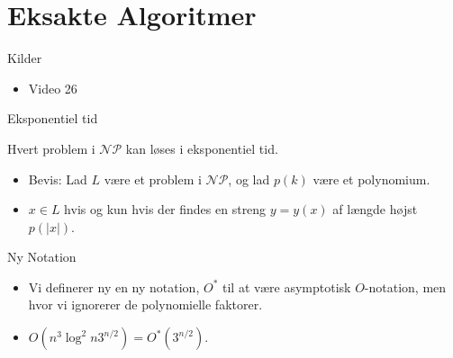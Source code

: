 \section{Eksakte Algoritmer}

\begin{frame}{Kilder}
    \begin{itemize}
        \item Video 26
    \end{itemize}
\end{frame}

\begin{frame}{Eksponentiel tid}
    \begin{theorem}
        Hvert problem i $\mathcal{NP}$ kan løses i eksponentiel tid.
    \end{theorem}
    \begin{itemize}
        \item Bevis: Lad $L$ være et problem i $\mathcal{NP}$, og lad $p(k)$ være et polynomium.
        \item $x \in L$ hvis og kun hvis der findes en streng $y = y(x)$ af længde højst $p(|x|)$.
    \end{itemize}
\end{frame}

\begin{frame}{Ny Notation}
    \begin{itemize}
        \item Vi definerer ny en ny notation, $O^{*}$ til at være asymptotisk $O$-notation, men hvor vi ignorerer de polynomielle faktorer.
        \item $O(n^{3}\log^{2}n 3^{n/2}) = O^{*}(3^{n/2})$.
    \end{itemize}
\end{frame}

